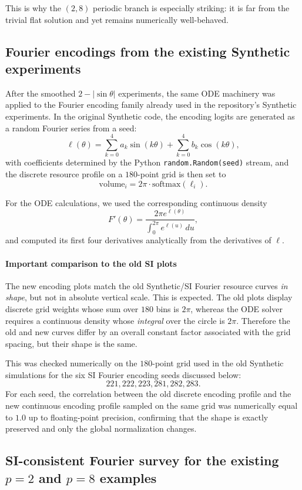 \documentclass[11pt]{article}
\begin{document}
This is why the $(2,8)$ periodic branch is especially striking: it is far from the trivial flat solution and yet remains numerically well-behaved.

\subsection{Fourier encodings from the existing Synthetic experiments}

After the smoothed $2-|\sin\theta|$ experiments, the same ODE machinery was applied to the Fourier encoding family already used in the repository's Synthetic experiments. In the original Synthetic code, the encoding logits are generated as a random Fourier series from a seed:
\[
\ell(\theta)=\sum_{k=0}^{4} a_k \sin(k\theta) + \sum_{k=0}^{4} b_k \cos(k\theta),
\]
with coefficients determined by the Python \texttt{random.Random(seed)} stream, and the discrete resource profile on a $180$-point grid is then set to
\[
\mathrm{volume}_i = 2\pi \cdot \mathrm{softmax}(\ell_i).
\]

For the ODE calculations, we used the corresponding continuous density
\[
F'(\theta)=\frac{2\pi e^{\ell(\theta)}}{\int_0^{2\pi} e^{\ell(u)}\,du},
\]
and computed its first four derivatives analytically from the derivatives of $\ell$.

\paragraph*{Important comparison to the old SI plots}
The new encoding plots match the old Synthetic/SI Fourier resource curves \emph{in shape}, but not in absolute vertical scale. This is expected. The old plots display discrete grid weights whose sum over $180$ bins is $2\pi$, whereas the ODE solver requires a continuous density whose \emph{integral} over the circle is $2\pi$. Therefore the old and new curves differ by an overall constant factor associated with the grid spacing, but their shape is the same.

This was checked numerically on the $180$-point grid used in the old Synthetic simulations for the six SI Fourier encoding seeds discussed below:
\[
221,222,223,281,282,283.
\]
For each seed, the correlation between the old discrete encoding profile and the new continuous encoding profile sampled on the same grid was numerically equal to $1.0$ up to floating-point precision, confirming that the shape is exactly preserved and only the global normalization changes.

\subsection{SI-consistent Fourier survey for the existing $p=2$ and $p=8$ examples}
\end{document}
